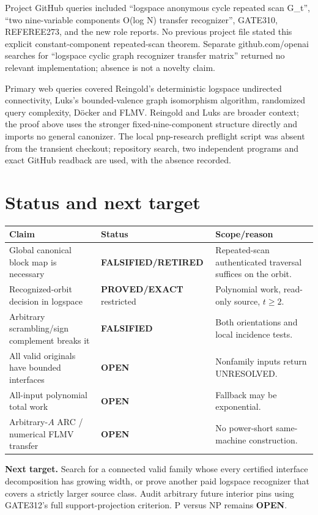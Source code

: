 \documentclass[11pt]{article}
\begin{document}
Project GitHub queries included ``logspace anonymous cycle repeated scan G\_t'',
``two nine-variable components O(log N) transfer recognizer'', GATE310, REFEREE273,
and the new role reports.  No previous project file stated this explicit
constant-component repeated-scan theorem.  Separate github.com/openai searches for
``logspace cyclic graph recognizer transfer matrix'' returned no relevant
implementation; absence is not a novelty claim.

Primary web queries covered Reingold's deterministic logspace undirected
connectivity, Luks's bounded-valence graph isomorphism algorithm, randomized query
complexity, D\"ocker and FLMV.  Reingold and Luks are broader context; the proof
above uses the stronger fixed-nine-component structure directly and imports no
general canonizer.  The local pnp-research preflight script was absent from the
transient checkout; repository search, two independent programs and exact GitHub
readback are used, with the absence recorded.

\section{Status and next target}
\begin{center}\scriptsize\begin{tabular}{p{.36\linewidth}p{.19\linewidth}p{.29\linewidth}}\toprule
Claim&Status&Scope/reason\\\midrule
Global canonical block map is necessary&\textbf{FALSIFIED/RETIRED}&Repeated-scan authenticated traversal suffices on the orbit.\\
Recognized-orbit decision in logspace&\textbf{PROVED/EXACT} restricted&Polynomial work, read-only source, $t\ge2$.\\
Arbitrary scrambling/sign complement breaks it&\textbf{FALSIFIED}&Both orientations and local incidence tests.\\
All valid originals have bounded interfaces&\textbf{OPEN}&Nonfamily inputs return UNRESOLVED.\\
All-input polynomial total work&\textbf{OPEN}&Fallback may be exponential.\\
Arbitrary-$A$ ARC / numerical FLMV transfer&\textbf{OPEN}&No power-short same-machine construction.\\\bottomrule
\end{tabular}\end{center}

\noindent\textbf{Next target.} Search for a connected valid family whose every
certified interface decomposition has growing width, or prove another paid
logspace recognizer that covers a strictly larger source class.  Audit arbitrary
future interior pins using GATE312's full support-projection criterion.  P versus
NP remains \textbf{OPEN}.
\end{document}
